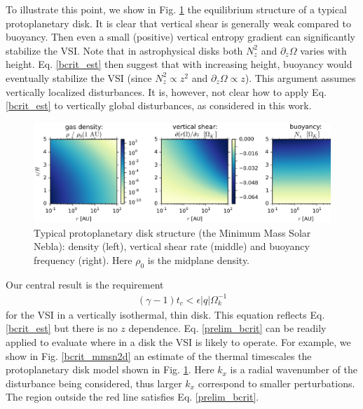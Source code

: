\documentclass[iop]{emulateapj}
\newcommand{\p}{\partial}
\begin{document}
To illustrate this point, we show in Fig. \ref{eqm_structure} the
equilibrium structure of a typical protoplanetary disk. %
It is
clear that vertical shear is 
generally weak compared to buoyancy. Then even a small (positive)
vertical entropy gradient can significantly stabilize the VSI. 
Note that in astrophysical disks both $N_z^2$ and $\p_z\Omega$ varies
with height. Eq. \ref{bcrit_est} then suggest that with
increasing height, buoyancy would eventually stabilize the VSI (since
$N_z^2\propto z^2$ and $\p_z\Omega\propto z$).
This argument assumes vertically localized disturbances. It is,
however, not clear how to apply Eq. \ref{bcrit_est} to vertically
global disturbances, as considered in this work.

\begin{figure}
  \includegraphics[width=\linewidth]{figures/rhoshearNz}
  \caption{Typical protoplanetary disk structure (the Minimum Mass
    Solar Nebla): density (left), vertical shear rate (middle) and
    buoyancy frequency (right). Here $\rho_0$ is the midplane density.  
    \label{eqm_structure} 
  }
\end{figure}


Our central result is the requirement 
\begin{align}\label{prelim_bcrit}
  (\gamma - 1)t_c < \epsilon |q| \Omega_k^{-1}
\end{align}   
for the VSI in a vertically isothermal, thin disk. This equation
reflects Eq. \ref{bcrit_est} but there is no $z$ dependence. 
Eq. \ref{prelim_bcrit} can be 
readily applied to evaluate where in a disk the VSI is likely to
operate. For example, we show in Fig. \ref{bcrit_mmsn2d} an estimate
of the thermal timescales the protoplanetary disk model shown in
Fig. \ref{eqm_structure}. Here $k_x$ is a radial
wavenumber of the disturbance being considered, thus larger $k_x$
correspond to smaller perturbations. The region outside the red line
satisfies Eq. \ref{prelim_bcrit}. 
\end{document}
